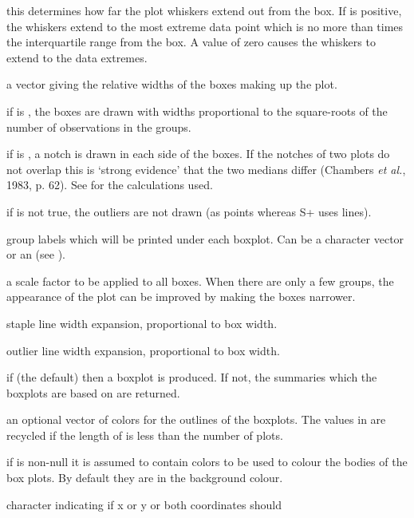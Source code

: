 \begin{Arguments}
\begin{ldescription}
\item[\code{range}] this determines how far the plot whiskers extend out
from the box.  If  is positive, the whiskers extend
to the most extreme data point which is no more than
 times the interquartile range from the box. A value
of zero causes the whiskers to extend to the data extremes.
\item[\code{width}] a vector giving the relative widths of the boxes making
up the plot.
\item[\code{varwidth}] if  is , the boxes are
drawn with widths proportional to the square-roots of the number
of observations in the groups.
\item[\code{notch}] if  is , a notch is drawn in
each side of the boxes.  If the notches of two plots do not
overlap this is `strong evidence' that the two medians differ
(Chambers \emph{et al.}, 1983, p. 62).  See 
for the calculations used.
\item[\code{outline}] if  is not true, the outliers are
not drawn (as points whereas S+ uses lines).
\item[\code{names}] group labels which will be printed under each boxplot.
Can be a character vector or an  (see
).
\item[\code{boxwex}] a scale factor to be applied to all boxes.  When there
are only a few groups, the appearance of the plot can be improved
by making the boxes narrower.
\item[\code{staplewex}] staple line width expansion, proportional to box
width.
\item[\code{outwex}] outlier line width expansion, proportional to box
width.
\item[\code{plot}] if  (the default) then a boxplot is
produced.  If not, the summaries which the boxplots are based on
are returned.
\item[\code{border}] an optional vector of colors for the outlines of the
boxplots.  The values in  are recycled if the
length of  is less than the number of plots.
\item[\code{col}] if  is non-null it is assumed to contain colors
to be used to colour the bodies of the box plots. By default they
are in the background colour.
\item[\code{log}] character indicating if x or y or both coordinates should

\end{ldescription}
\end{Arguments}
